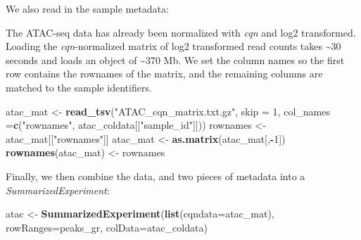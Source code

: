 \documentclass[
  9pt,
  a4paper,
]{extarticle}
\newenvironment{Shaded}{\begin{snugshade}}{\end{snugshade}}
\newcommand{\DataTypeTok}[1]{\textcolor[rgb]{0.13,0.29,0.53}{#1}}
\newcommand{\DecValTok}[1]{\textcolor[rgb]{0.00,0.00,0.81}{#1}}
\newcommand{\KeywordTok}[1]{\textcolor[rgb]{0.13,0.29,0.53}{\textbf{#1}}}
\newcommand{\NormalTok}[1]{#1}
\newcommand{\OperatorTok}[1]{\textcolor[rgb]{0.81,0.36,0.00}{\textbf{#1}}}
\newcommand{\StringTok}[1]{\textcolor[rgb]{0.31,0.60,0.02}{#1}}
\begin{document}
We also read in the sample metadata:

\begin{Shaded}
\end{Shaded}

The ATAC-seq data has already been normalized with \emph{cqn} \citep{Hansen2012} and log2
transformed. Loading the \emph{cqn}-normalized matrix of log2 transformed read
counts takes \textasciitilde30 seconds and loads an object of \textasciitilde370 Mb. We set the column
names so the first row contains the rownames of the matrix, and the remaining
columns are matched to the sample identifiers.

\begin{Shaded}
\begin{Highlighting}[]
\NormalTok{atac_mat <-}\StringTok{ }\KeywordTok{read_tsv}\NormalTok{(}\StringTok{"ATAC_cqn_matrix.txt.gz"}\NormalTok{,}
                     \DataTypeTok{skip =} \DecValTok{1}\NormalTok{,}
                     \DataTypeTok{col_names =}\KeywordTok{c}\NormalTok{(}\StringTok{"rownames"}\NormalTok{, atac_coldata[[}\StringTok{"sample_id"}\NormalTok{]]))}
\NormalTok{rownames <-}\StringTok{ }\NormalTok{atac_mat[[}\StringTok{"rownames"}\NormalTok{]]}
\NormalTok{atac_mat <-}\StringTok{ }\KeywordTok{as.matrix}\NormalTok{(atac_mat[,}\OperatorTok{-}\DecValTok{1}\NormalTok{])}
\KeywordTok{rownames}\NormalTok{(atac_mat) <-}\StringTok{ }\NormalTok{rownames}
\end{Highlighting}
\end{Shaded}

Finally, we then combine the data, and two pieces of metadata into a
\emph{SummarizedExperiment}:

\begin{Shaded}
\begin{Highlighting}[]
\NormalTok{atac <-}\StringTok{ }\KeywordTok{SummarizedExperiment}\NormalTok{(}\KeywordTok{list}\NormalTok{(}\DataTypeTok{cqndata=}\NormalTok{atac_mat),}
                             \DataTypeTok{rowRanges=}\NormalTok{peaks_gr,}
                             \DataTypeTok{colData=}\NormalTok{atac_coldata)}
\end{Highlighting}
\end{Shaded}
\end{document}
